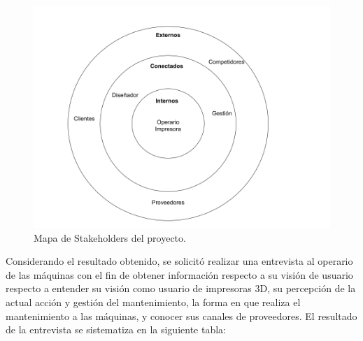\begin{figure}[H]
\centering
\includegraphics[scale=0.4]{images/stakeholders.png}
\caption{Mapa de Stakeholders del proyecto.}
\end{figure}

Considerando el resultado obtenido, se solicitó realizar una entrevista al operario de las máquinas con el fin de obtener información respecto a su visión de usuario respecto a entender su visión como usuario de impresoras 3D, su percepción de la actual acción y gestión del mantenimiento, la forma en que realiza el mantenimiento a las máquinas, y conocer sus canales de proveedores. El resultado de la entrevista se sistematiza en la siguiente tabla:


